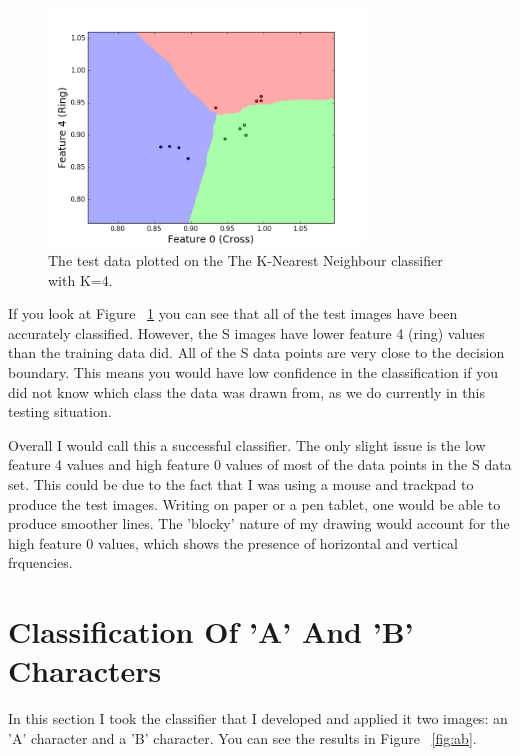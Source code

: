 \documentclass[11pt, a4paper]{article}
\begin{document}
\begin{figure}[ht]
	\centering
	\includegraphics[trim={0 0 0 1cm},clip,width=0.75\textwidth]{test_plot.png}
	\caption{The test data plotted on the The K-Nearest Neighbour classifier with K=4.}
	\label{fig:classifier_test}
\end{figure}

If you look at Figure ~\ref{fig:classifier_test} you can see that all of the test images have been accurately classified. However, the S images have lower feature 4 (ring) values than the training data did. All of the S data points are very close to the decision boundary. This means you would have low confidence in the classification if you did not know which class the data was drawn from, as we do currently in this testing situation. 

Overall I would call this a successful classifier. The only slight issue is the low feature 4 values and high feature 0 values of most of the data points in the S data set. This could be due to the fact that I was using a mouse and trackpad to produce the test images. Writing on paper or a pen tablet, one would be able to produce smoother lines. The 'blocky' nature of my drawing would account for the high feature 0 values, which shows the presence of horizontal and vertical frquencies. 

\section{Classification Of 'A' And 'B' Characters}

In this section I took the classifier that I developed and applied it two images: an 'A' character and a 'B' character. You can see the results in Figure ~\ref{fig:ab}.
\end{document}
